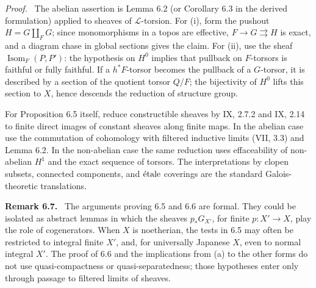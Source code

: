 \documentclass[12pt]{article}
\newcommand{\LL}{\mathcal L}
\newcommand{\Isom}{\operatorname{Isom}}
\newcommand{\etale}{\ifmmode\textnormal{\'etale}\else\'etale\fi}
\newenvironment{remarktext}[1]{\par\medskip\noindent\textbf{#1.}\ }{\par\medskip}
\newenvironment{prooftext}[1][Proof]{\par\noindent\emph{#1.}\ }{\par\medskip}
\begin{document}
\begin{prooftext}
The abelian assertion is Lemma 6.2 (or Corollary 6.3 in the derived formulation) applied to sheaves of \(\LL\)-torsion. For (i), form the pushout \(H=G\amalg_FG\); since monomorphisms in a topos are effective, \(F\to G\rightrightarrows H\) is exact, and a diagram chase in global sections gives the claim. For (ii), use the sheaf \(\Isom_F(P,P')\): the hypothesis on \(H^0\) implies that pullback on \(F\)-torsors is faithful or fully faithful. If a \(h^*F\)-torsor becomes the pullback of a \(G\)-torsor, it is described by a section of the quotient torsor \(Q/F\); the bijectivity of \(H^0\) lifts this section to \(X\), hence descends the reduction of structure group.

For Proposition 6.5 itself, reduce constructible sheaves by IX, 2.7.2 and IX, 2.14 to finite direct images of constant sheaves along finite maps. In the abelian case use the commutation of cohomology with filtered inductive limits (VII, 3.3) and Lemma 6.2. In the non-abelian case the same reduction uses effaceability of non-abelian \(H^1\) and the exact sequence of torsors. The interpretations by clopen subsets, connected components, and \(\etale\) coverings are the standard Galois-theoretic translations.
\end{prooftext}

\begin{remarktext}{Remark 6.7}
The arguments proving 6.5 and 6.6 are formal. They could be isolated as abstract lemmas in which the sheaves \(p_*G_{X'}\), for finite \(p:X'\to X\), play the role of cogenerators. When \(X\) is noetherian, the tests in 6.5 may often be restricted to integral finite \(X'\), and, for universally Japanese \(X\), even to normal integral \(X'\). The proof of 6.6 and the implications from (a) to the other forms do not use quasi-compactness or quasi-separatedness; those hypotheses enter only through passage to filtered limits of sheaves.
\end{remarktext}
\end{document}
